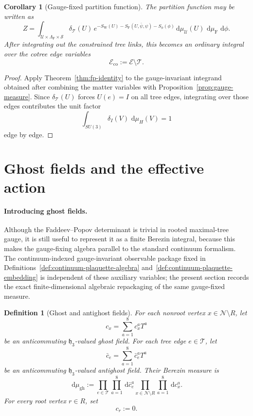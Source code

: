 \documentclass[11pt]{article}
\newtheorem{definition}[theorem]{Definition}
\newtheorem{corollary}[theorem]{Corollary}
\theoremstyle{remark}
\newcommand{\mcN}{\mathcal N}
\newcommand{\mcE}{\mathcal E}
\newcommand{\mcT}{\mathcal T}
\newcommand{\mcU}{\mathscr U}
\newcommand{\mcS}{\mathscr S}
\newcommand{\dd}{\,\mathrm d}
\newcommand{\mcHh}{\mathfrak h_3}
\begin{document}
\begin{corollary}[Gauge-fixed partition function]
\label{cor:gauge-fixed-z}
The partition function may be written as
\[
Z=
\int_{\mcU\times\Lambda_{\mathrm F}\times\mcS}
\delta_{\mcT}(U)\,
e^{-S_{\mathrm W}(U)-S_{\mathrm F}(U,\bar\psi,\psi)-S_\phi(\phi)}
\dd\mu_{\mcU}(U)\,\dd\mu_{\mathrm F}\,\dd\phi.
\]
After integrating out the constrained tree links, this becomes an ordinary
integral over the cotree edge variables
\[
\mcE_{\mathrm{co}}:=\mcE\setminus\mcT.
\]
\end{corollary}
\begin{proof}
Apply Theorem~\ref{thm:fp-identity} to the gauge-invariant integrand
obtained after combining the matter variables with
Proposition~\ref{prop:gauge-measure}.  Since $\delta_{\mcT}(U)$ forces
$U(e)=I$ on all tree edges, integrating over those edges contributes the unit
factor
\[
\int_{SU(3)}\delta_I(V)\,\dd\mu_H(V)=1
\]
edge by edge.
\end{proof}

\section{Ghost fields and the effective action}
\label{sec:ghosts}

\paragraph{Introducing ghost fields.}
Although the Faddeev--Popov determinant is trivial in rooted maximal-tree
gauge, it is still useful to represent it as a finite Berezin integral, because
this makes the gauge-fixing algebra parallel to the standard continuum
formalism.  The continuum-indexed gauge-invariant observable package fixed in
Definitions~\ref{def:continuum-plaquette-algebra}
and~\ref{def:continuum-plaquette-embedding} is independent of these auxiliary
variables; the present section records the exact finite-dimensional algebraic
repackaging of the same gauge-fixed measure.

\begin{definition}[Ghost and antighost fields]
\label{def:ghosts}
For each nonroot vertex $x\in\mcN\setminus R$, let
\[
c_x=\sum_{a=1}^8 c_x^a T^a
\]
be an anticommuting $\mcHh$-valued ghost field.  For each tree edge
$e\in\mcT$, let
\[
\bar c_e=\sum_{a=1}^8 \bar c_e^a T^a
\]
be an anticommuting $\mcHh$-valued antighost field.  Their Berezin measure is
\[
\dd\mu_{\mathrm{gh}}
:=
\prod_{e\in\mcT}\prod_{a=1}^8 \dd\bar c_e^a
\prod_{x\in\mcN\setminus R}\prod_{a=1}^8 \dd c_x^a.
\]
For every root vertex $r\in R$, set
\[
c_r:=0.
\]
\end{definition}
\end{document}
